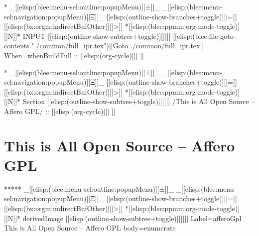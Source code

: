 \begin{whenOrg}
\begin{whenOrg}
*  _[[elisp:(blee:menu-sel:outline:popupMenu)][±]]_ _[[elisp:(blee:menu-sel:navigation:popupMenu)][Ξ]]_ [[elisp:(outline-show-branches+toggle)][|=]] [[elisp:(bx:orgm:indirectBufOther)][|>]] *[[elisp:(blee:ppmm:org-mode-toggle)][|N]]*  INPUT      [[elisp:(outline-show-subtree+toggle)][||]]   [[elisp:(blee:file-goto-contents "./common/full_ipr.tex")][Goto ./common/full_ipr.tex]] When=whenBuildFull ::  [[elisp:(org-cycle)][| ]]
\end{whenOrg}
\begin{whenBuildFull}

\end{whenBuildFull}


\begin{whenOrg}
*  _[[elisp:(blee:menu-sel:outline:popupMenu)][±]]_ _[[elisp:(blee:menu-sel:navigation:popupMenu)][Ξ]]_ [[elisp:(outline-show-branches+toggle)][|=]] [[elisp:(bx:orgm:indirectBufOther)][|>]] *[[elisp:(blee:ppmm:org-mode-toggle)][|N]]*  Section    [[elisp:(outline-show-subtree+toggle)][||]]   /This is All Open Source -- Affero GPL/ ::  [[elisp:(org-cycle)][| ]]
\end{whenOrg}

\section{This is All Open Source -- Affero GPL}

\begin{whenOrg}
*****  _[[elisp:(blee:menu-sel:outline:popupMenu)][±]]_ _[[elisp:(blee:menu-sel:navigation:popupMenu)][Ξ]]_ [[elisp:(outline-show-branches+toggle)][|=]] [[elisp:(bx:orgm:indirectBufOther)][|>]] *[[elisp:(blee:ppmm:org-mode-toggle)][|N]]*  derivedImage [[elisp:(outline-show-subtree+toggle)][||]] Label=afferoGpl This is All Open Source -- Affero GPL body=enumerate
\end{whenOrg}

\begin{htmlonly}


\end{htmlonly}
\end{whenOrg}

